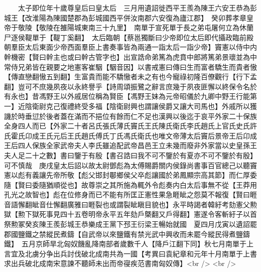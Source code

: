 　　太子即位年十歲尊皇后曰皇太后　三月用遺詔徙西平王羨為陳王六安王恭為彭城王【改淮陽為陳國楚郡為彭城國西平併汝南郡六安復為廬江郡】　癸卯葬孝章皇帝于敬陵【敬陵在雒陽城東南三十九里】　南單于宣死單于長之弟屯屠何立為休蘭尸逐侯鞮單于【鞮丁奚翻】　太后臨朝【蔡邕獨斷曰少帝即位太后即代攝政臨前殿朝羣臣太后東面少帝西面羣臣上書奏事皆為兩通一詣太后一詣少帝】竇憲以侍中内幹機密【賢曰幹主也或曰幹古管字也】出宣誥命弟篤為虎賁中郎將篤弟景瓌並為中常侍兄弟皆在親要之地憲客崔駰【駰音因】以書戒憲曰傳曰生而富者驕生而貴者慠【傳直戀翻慠五到翻】生富貴而能不驕慠者未之有也今寵祿初隆百僚觀行【行下孟翻】豈可不庶幾夙夜以永終譽乎【詩周頌振鷺之辭言庶幾于夙夜匪懈以終保令名於有永也】昔馮野王以外戚居位稱為賢臣【馮野王妹為元帝昭儀於九卿中野王行能第一】近陰衛尉克己復禮終受多福【陰衛尉興也謂讓侯爵又讓大司馬也】外戚所以獲譏於時垂愆於後者蓋在滿而不挹位有餘而仁不足也漢興以後迄于哀平外家二十保族全身四人而已【外家二十者呂氏張氏薄氏竇氏王氏陳氏衛氏李氏趙氏上官氏史氏許氏霍氏卬成王氏元后王氏趙氏傅氏丁氏馮氏衛氏也唯文帝薄太后竇后景帝王后卬成王后四人保族全家武帝夫人李氏雖追配武帝昌邑王立未幾而廢非外家當以史皇孫王夫人足二十之數】書曰鑒于有殷【書召誥曰我不可不鑒於有夏亦不可不鑒於有殷】可不慎哉　庚戌皇太后詔以故太尉鄧彪為太傅賜爵關内侯錄尚書事百官總己以聽竇憲以彪有義讓先帝所敬【彪父邯封鄳鄉侯父卒彪讓國於弟鳳顯宗高其節】而仁厚委隨【賢曰委隨猶順從也】故尊崇之其所施為輒外令彪奏内白太后事無不從【王莽用孔光之故智也】彪在位修身而已不能有所匡正憲性果急睚眦之怨莫不報復【賢曰睚音語懈翻眦音仕懈翻廣雅曰睚裂也或謂裂眦瞋目貌也】永平時謁者韓紆考劾憲父勲獄【勲下獄死事見四十五卷明帝永平五年劾戶槩翻又戶得翻】憲遂令客斬紆子以首祭勲冢癸亥陳王羨彭城王恭樂成王黨下邳王衍梁王暢始就國　夏四月戊寅以遺詔罷郡國鹽鐵之禁縱民煮鑄【自武帝以來鹽鐵有禁光武中興收而未罷今縱民得煮鹽鑄鐵】　五月京師旱北匈奴饑亂降南部者歲數千人【降戶江翻下同】秋七月南單于上言宜及北虜分争出兵討伐破北成南共為一國【考異曰袁紀章和元年十月南單于上書求出兵破北成南宋意諫不聽師未出而帝寑疾范書南匈奴傳】<br />
<br />

